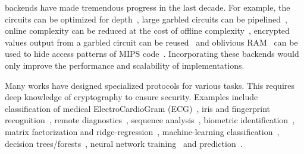 \mpc backends  have made  tremendous progress in the last decade.
For example, the circuits can be optimized for depth~\cite{ddkssz15,cbmcgcdepth}, large garbled circuits can be pipelined~\cite{yao-pipe,oblivm}, online complexity can be reduced at the cost of offline complexity~\cite{groce}, encrypted values output from a garbled circuit can be reused~\cite{ReuseOrLose} and oblivious RAM~\cite{oram1,oram2} can be used to hide access patterns of MIPS code~\cite{mips}. 
Incorporating these backends would only improve the performance and scalability of \tool implementations. 

Many works have designed specialized protocols for various \mpc tasks. 
This requires deep knowledge of cryptography
to ensure security.
Examples include classification of medical ElectroCardioGram (ECG)~\cite{barni}, iris and fingerprint recognition~\cite{blanton}, remote diagnostics~\cite{brickell}, sequence analysis~\cite{franz}, biometric identification~\cite{huang}, matrix factorization and ridge-regression~\cite{valeriaMatrix, valeriaRidge}, machine-learning classification~\cite{shafindss}, decision trees/forests~\cite{wu}, neural network training~\cite{secureml} and prediction~\cite{minionn}.

